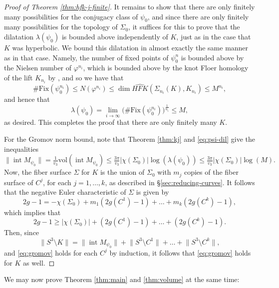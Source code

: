 \documentclass[11pt]{amsart}
\numberwithin{equation}{section}
\numberwithin{theorem}{section}
\theoremstyle{definition}
\newcommand\HFK{\widehat{\mathit{HFK}}}
\newcommand{\inr}{\operatorname{int}}
\begin{document}
\begin{proof}[Proof of Theorem \ref{thm:hfk-j-finite}]
It remains to show that there are only finitely many possibilities for the conjugacy class of $\psi_0$, and since there are only finitely many possibilities for the topology of $\Sigma_0$, it suffices for this to prove that the dilatation $\lambda(\psi_0)$ is bounded above independently of $K$, just as in the case that $K$ was hyperbolic. We bound this dilatation in almost exactly the same manner as in that case. Namely, the number of fixed points of $\psi_0^n$ is bounded above by the Nielsen number of $\varphi^{n_i}$, which is bounded above by the knot Floer homology of the lift $K_{n_i}$ by \cite{ni-fixed,ghiggini-spano}, and so we have that \[\#\textrm{Fix}(\psi_0^{n_i})\leq N(\varphi^{n_i})\leq \dim\HFK(\Sigma_{n_i}(K),K_{n_i})\leq M^{n_i},\] and hence that \begin{equation}\label{eq:psi-dil}\lambda(\psi_0) = \lim_{i\to \infty} \big(\#\textrm{Fix}(\psi_0^{n_i})\big)^{\frac{1}{n_i}}\leq M,\end{equation} as desired. This completes the proof that there are only finitely many $K$.

For the Gromov norm bound, note that Theorem \ref{thm:kj} and \eqref{eq:psi-dil} give the inequalities \[\lVert \inr M_{\psi_0}\rVert = \tfrac{1}{v_3}\mathrm{vol}(\inr M_{\psi_0}) \leq \tfrac{3\pi}{v_3}|\chi(\Sigma_0)|\log(\lambda(\psi_0))\leq \tfrac{3\pi}{v_3}|\chi(\Sigma_0)|\log(M).\] Now, the fiber surface $\Sigma$ for $K$ is the union of $\Sigma_0$ with $m_j$ copies of the fiber surface of $C^j$, for each $j=1,\dots,k$, as described in \S\ref{sec:reducing-curves}. It follows that the negative Euler characteristic of $\Sigma$ is given by \[2g-1 = -\chi(\Sigma_0) + m_1(2g(C^1)-1) + \dots + m_k(2g(C^k)-1),\] which implies that \[2g-1 \geq |\chi(\Sigma_0)| + (2g(C^1)-1) + \dots + (2g(C^k)-1).\] Then, since \[\lVert S^3\setminus K\rVert =  \lVert \inr M_{\psi_0}\rVert + \lVert S^3\setminus C^1\rVert + \dots + \lVert S^3\setminus C^k\rVert,\] and  \eqref{eq:gromov} holds for each $C^j$ by induction, it follows that \eqref{eq:gromov} holds for $K$ as well. 
\end{proof}

We may now prove Theorem \ref{thm:main} and \ref{thm:volume} at the same time:
\end{document}
